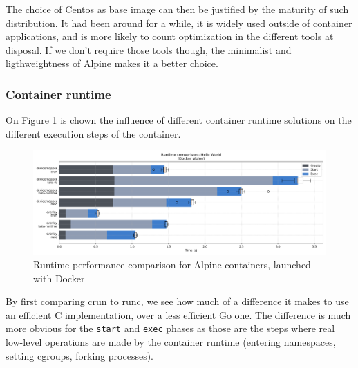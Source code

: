 The choice of Centos as base image can then be justified by the maturity of such distribution.  It had been around for a while, it is widely used outside of container applications, and is more likely to count optimization in the different tools at disposal.  If we don't require those tools though, the minimalist and ligthweightness of Alpine makes it a better choice.

\subsubsection{Container runtime}

On Figure \ref{fig:q1:runtime} is chown the influence of different container runtime solutions on the different execution steps of the container.  

\begin{figure}[h!]
  \begin{center}
    \includegraphics[width=\linewidth]{images/question-1-runtime.png}
    \caption{Runtime performance comparison for Alpine containers, launched with Docker}
    \label{fig:q1:runtime}
  \end{center}
\end{figure}

By first comparing crun to runc, we see how much of a difference it makes to use an efficient C implementation, over a less efficient Go one.  The difference is much more obvious for the \texttt{start} and \texttt{exec} phases as those are the steps where real low-level operations are made by the container runtime (entering namespaces, setting cgroups, forking processes).  


